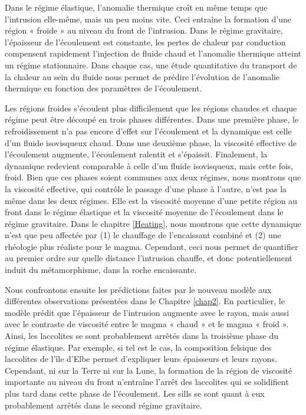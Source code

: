 Dans le régime élastique, l’anomalie thermique croît en même temps que
l’intrusion  elle-même,  mais un  peu  moins  vite. Ceci  entraîne  la
formation   d’une  région   «  froide   »  au   niveau  du   front  de
l’intrusion. Dans  le régime  gravitaire, l’épaisseur  de l’écoulement
est  constante,  les  pertes  de  chaleur  par  conduction  compensent
rapidement l’injection de fluide chaud et l’anomalie thermique atteint
un régime  stationnaire. Dans  chaque cas,  une étude  quantitative du
transport  de la  chaleur au  sein du  fluide nous  permet de  prédire
l’évolution  de l’anomalie  thermique  en fonction  des paramètres  de
l’écoulement.

Les  régions froides  s’écoulent  plus difficilement  que les  régions
chaudes  et   chaque  régime  peut   être  découpé  en   trois  phases
différentes.   Dans une  première  phase, le  refroidissement n'a  pas
encore d'effet sur l'écoulement et  la dynamique est celle d'un fluide
isovisqueux chaud.  Dans une deuxième phase, la viscosité effective de
l'écoulement   augmente,   l’écoulement    ralentit   et   s’épaissit.
Finalement,  la dynamique  redevient  comparable à  celle d'un  fluide
isovisqueux,  mais cette  fois,  froid.  Bien  que  ces phases  soient
communes aux deux  régimes, nous montrons que  la viscosité effective,
qui contrôle le passage d'une phase  à l'autre, n’est pas la même dans
les deux régimes.   Elle est la viscosité moyenne  d’une petite région
au  front  dans  le  régime  élastique  et  la  viscosité  moyenne  de
l’écoulement   dans   le   régime  gravitaire.    Dans   le   chapitre
\ref{Heating},  nous  montrons  que  cette  dynamique  n’est  que  peu
affectée  par (1)  le chauffage  de  l’encaissant combiné  et (2)  une
rhéologie plus réaliste pour le  magma. Cependant, ceci nous permet de
quantifier au  premier ordre sur quelle  distance l'intrusion chauffe,
et  donc  potentiellement  induit  du  métamorphisme,  dans  la  roche
encaissante.

Nous confrontons ensuite les prédictions faites par le nouveau modèle
aux différentes observations présentées dans le Chapitre \ref{chap2}. En particulier, le modèle prédit que l’épaisseur de l’intrusion
augmente avec le rayon, mais aussi avec le contraste de viscosité
entre le magma « chaud » et le magma « froid ». Ainsi, les laccolites
se sont probablement arrêtés dans la troisième phase du régime
élastique. Par exemple, si tel est le cas, la composition felsique des
laccolites de l’île d’Elbe permet d’expliquer leurs épaisseurs et
leurs rayons. Cependant, ni sur la Terre ni sur la Lune, la formation
de la région de viscosité importante au niveau du front n’entraîne
l'arrêt des laccolites qui se solidifient plus tard dans cette phase
de l'écoulement. Les sills se sont quant à eux probablement arrêtés
dans le second régime gravitaire.

